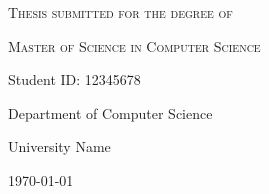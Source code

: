 \begin{titlepage}
    \centering
    \vspace*{1cm}

    {\Huge \bfseries \thesistitle \par}
    \vspace{1.5cm}

    {\scshape\Large Thesis submitted for the degree of\par}
    {\scshape\Large Master of Science in Computer Science\par}
    \vspace{2cm}

    {\Large \textbf{\thesisauthor}\par}
    \vspace{0.5cm}
    Student ID: 12345678\par

    \vfill

    Department of Computer Science\par
    University Name\par
    \today

\end{titlepage}
